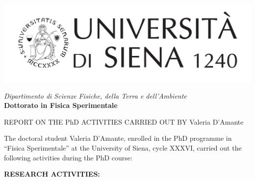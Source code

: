 \begin{titlepage}
\begin{spacing}{1.4}
%
\begin{minipage}{0.45\textwidth}
    \hspace{-1.5cm}
    \includegraphics[width=\textwidth]{../LOGO_UNISI_ORIZZONTALE_NERO_0.pdf}
\end{minipage}
\hspace{-2.5cm}
\begin{minipage}{0.7\textwidth}
    \flushright
    {
    \textit{Dipartimento di Scienze Fisiche, della Terra e dell’Ambiente}\\ \textbf{Dottorato in Fisica Sperimentale}
    }
\end{minipage}
%

\vspace{1cm}


{
    \large
REPORT ON THE PhD ACTIVITIES CARRIED OUT BY Valeria D'Amante
}



The doctoral student Valeria D'Amante, enrolled in the PhD programme in “Fisica Sperimentale” at the University of Siena, cycle XXXVI, carried out the following activities during the PhD course:

\textbf{\textsc{RESEARCH ACTIVITIES}:}\\



\end{spacing}
\end{titlepage}
